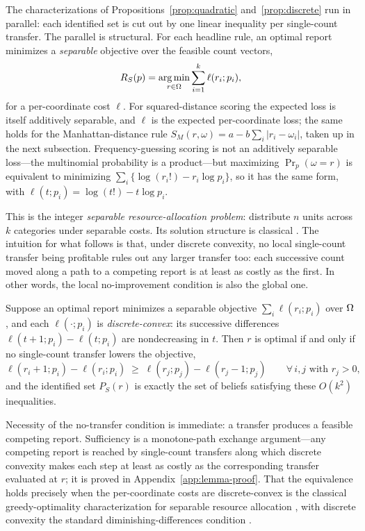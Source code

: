 The characterizations of Propositions~\ref{prop:quadratic} and~\ref{prop:discrete} run in parallel: each identified set is cut out by one linear inequality per single-count transfer.
The parallel is structural.
For each headline rule, an optimal report minimizes a \emph{separable} objective over the feasible count vectors,
\[
R_S(p)=\operatorname*{arg\,min}_{r\in\Omega}\sum_{i=1}^k\ell(r_i;p_i),
\]
for a per-coordinate cost \(\ell\).
For squared-distance scoring the expected loss is itself additively separable, and \(\ell\) is the expected per-coordinate loss; the same holds for the Manhattan-distance rule \(S_M(r,\omega)=a-b\sum_i|r_i-\omega_i|\), taken up in the next subsection.
Frequency-guessing scoring is not an additively separable loss---the multinomial probability is a product---but maximizing \(\Pr_p(\omega=r)\) is equivalent to minimizing \(\sum_i\{\log(r_i!)-r_i\log p_i\}\), so it has the same form, with \(\ell(t;p_i)=\log(t!)-t\log p_i\).

This is the integer \emph{separable resource-allocation problem}: distribute \(n\) units across \(k\) categories under separable costs.
Its solution structure is classical \citep{Fox1966,FedergruenGroenevelt1986,IbarakiKatoh1988}.
The intuition for what follows is that, under discrete convexity, no local single-count transfer being profitable rules out any larger transfer too: each successive count moved along a path to a competing report is at least as costly as the first.
In other words, the local no-improvement condition is also the global one.

\begin{lemma}\label{lem:transfer}
Suppose an optimal report minimizes a separable objective \(\sum_i\ell(r_i;p_i)\) over \(\Omega\), and each \(\ell(\cdot;p_i)\) is \emph{discrete-convex}: its successive differences \(\ell(t+1;p_i)-\ell(t;p_i)\) are nondecreasing in \(t\).
Then \(r\) is optimal if and only if no single-count transfer lowers the objective,
\[
\ell(r_i+1;p_i)-\ell(r_i;p_i)\;\ge\;\ell(r_j;p_j)-\ell(r_j-1;p_j)
\qquad\forall\,i,j\text{ with }r_j>0,
\]
and the identified set \(P_S(r)\) is exactly the set of beliefs satisfying these \(O(k^2)\) inequalities.
\end{lemma}

Necessity of the no-transfer condition is immediate: a transfer produces a feasible competing report.
Sufficiency is a monotone-path exchange argument---any competing report is reached by single-count transfers along which discrete convexity makes each step at least as costly as the corresponding transfer evaluated at \(r\); it is proved in Appendix~\ref{app:lemma-proof}.
That the equivalence holds precisely when the per-coordinate costs are discrete-convex is the classical greedy-optimality characterization for separable resource allocation \citep{Fox1966,FedergruenGroenevelt1986}, with discrete convexity the standard diminishing-differences condition \citep{Murota2003}.

